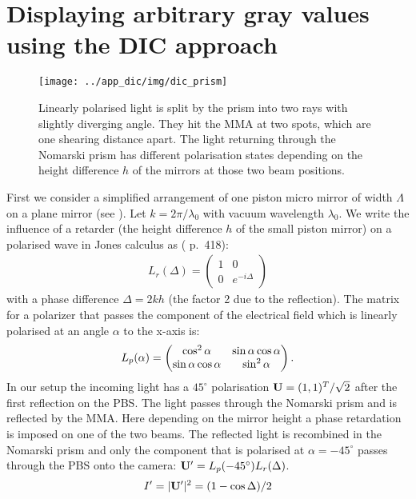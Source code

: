 \section{Displaying arbitrary gray values using the DIC approach}
\begin{figure}[htb]
  \centering
  \texttt{[image: ../app\_dic/img/dic\_prism]}
  \caption{ Linearly polarised light is split by the prism into two
    rays with slightly diverging angle. They hit the MMA at two spots,
    which are one shearing distance apart. The light returning through
    the Nomarski prism has different polarisation states depending on
    the height difference $h$ of the mirrors at those two beam
    positions.}
  \label{fig:prism}
\end{figure}
First we consider a simplified arrangement of one piston micro mirror
of width $\Lambda$ on a plane mirror (see ).  Let
$k=2\pi/\lambda_0$ with vacuum wavelength $\lambda_0$. We write the
influence of a retarder (the height difference $h$ of the small piston
mirror) on a polarised wave in Jones calculus as (\cite{Goodman1996}
p.~418):
\begin{align}
L_r(\Delta)=\begin{pmatrix}1&0\\ 0&e^{-i\Delta}\end{pmatrix}
\end{align}
with a phase difference $\Delta=2kh$ (the factor 2 due to the
reflection).  The matrix for a polarizer that passes the component of
the electrical field which is linearly polarised at an angle $\alpha$
to the x-axis is:
\begin{align}
L_p(\alpha)=\begin{pmatrix}\cos^2\alpha&\sin\alpha\cos\alpha\cr
  \sin\alpha\cos\alpha&\sin^2\alpha\end{pmatrix}.
\end{align}
In our setup the incoming light has a $45^\circ$ polarisation $\mathbf{U}=(1,1)^T/\sqrt{2}$ after the first reflection on the PBS. The light
passes through the Nomarski prism and is reflected by the MMA. Here
depending on the mirror height a phase retardation is imposed on one
of the two beams. The reflected light is recombined in the Nomarski
prism and only the component that is polarised at $\alpha=-45^\circ$
passes through the PBS onto the camera: $\mathbf{U}'=L_p(-45^\circ)L_r(\Delta)$.
\begin{align}
  I'=|\mathbf{U}'|^2=(1-\cos\Delta)/2
\end{align}
